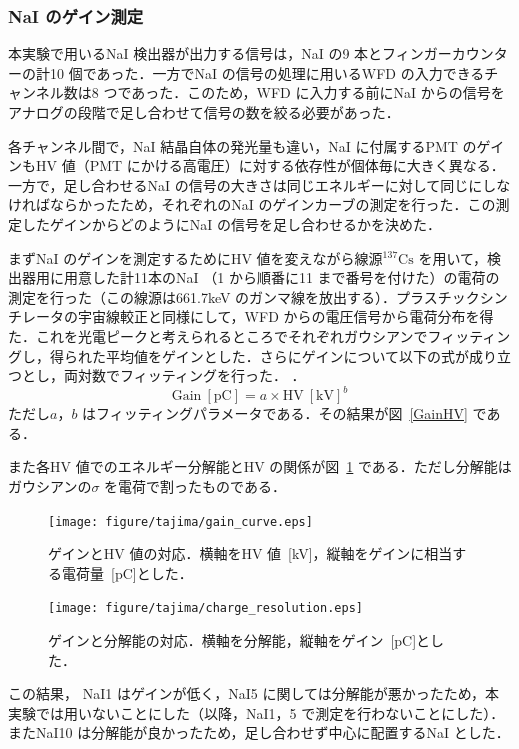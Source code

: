 \subsubsection{NaI のゲイン測定}
本実験で用いるNaI 検出器が出力する信号は，NaI の9 本とフィンガーカウンターの計10 個であった．一方でNaI の信号の処理に用いるWFD の入力できるチャンネル数は8 つであった．このため，WFD に入力する前にNaI からの信号をアナログの段階で足し合わせて信号の数を絞る必要があった．

各チャンネル間で，NaI 結晶自体の発光量も違い，NaI に付属するPMT のゲインもHV 値（PMT にかける高電圧）に対する依存性が個体毎に大きく異なる．一方で，足し合わせるNaI の信号の大きさは同じエネルギーに対して同じにしなければならかったため，それぞれのNaI のゲインカーブの測定を行った．この測定したゲインからどのようにNaI の信号を足し合わせるかを決めた．

まずNaI のゲインを測定するためにHV 値を変えながら線源${}^{137}\mathrm{Cs}$ を用いて，検出器用に用意した計11本のNaI （1 から順番に11 まで番号を付けた）の電荷の測定を行った（この線源は661.7keV のガンマ線を放出する）\cite{IAEA_ENSDF}．プラスチックシンチレータの宇宙線較正と同様にして，WFD からの電圧信号から電荷分布を得た．これを光電ピークと考えられるところでそれぞれガウシアンでフィッティングし，得られた平均値をゲインとした．さらにゲインについて以下の式が成り立つとし，両対数でフィッティングを行った．\cite{Hamamatsu_PMT} ．
\begin{equation}
\mathrm{Gain}~[\mathrm{pC}] = a \times \mathrm{HV}~[\mathrm{kV}]^b \label{gain_curve}  
\end{equation}
ただし$a， b$ はフィッティングパラメータである．その結果が図~\ref{GainHV} である．

また各HV 値でのエネルギー分解能とHV の関係が図~\ref{resoHV} である．ただし分解能はガウシアンの$\sigma$ を電荷で割ったものである．
\begin{figure}[H]
\begin{minipage}{0.45\hsize}
\centering
\hspace*{-1em}
\texttt{[image: figure/tajima/gain\_curve.eps]}
\caption{ゲインとHV 値の対応．横軸をHV 値~[kV]，縦軸をゲインに相当する電荷量~[pC]とした．}
\label{GainHV}
\end{minipage}
\hfill
\begin{minipage}{0.45\hsize}
\centering
\texttt{[image: figure/tajima/charge\_resolution.eps]}
\caption{ゲインと分解能の対応．横軸を分解能，縦軸をゲイン~[pC]とした．}
\label{resoHV}
\end{minipage}
\end{figure}
この結果， NaI1 はゲインが低く，NaI5 に関しては分解能が悪かったため，本実験では用いないことにした（以降，NaI1，5 で測定を行わないことにした）．
またNaI10 は分解能が良かったため，足し合わせず中心に配置するNaI とした．


